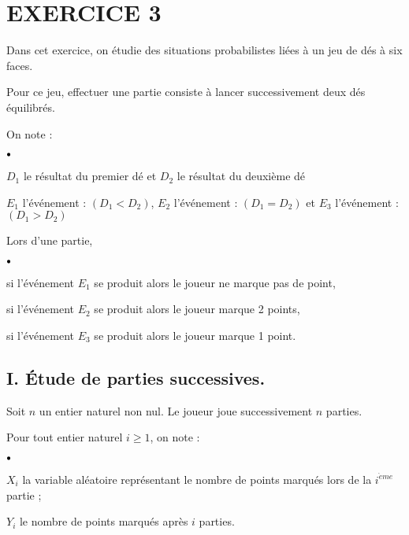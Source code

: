 \documentclass[11pt]{article}%
\begin{document}
\section*{EXERCICE 3}

Dans cet exercice, on étudie des situations probabilistes liées à
un jeu de dés à six faces.

Pour ce jeu, effectuer une partie consiste à lancer successivement deux
dés équilibrés.

On note :

\begin{noliste}{$\scriptstyle \bullet$}
\item $D_{1}$ le résultat du premier dé et $D_{2}$ le résultat
du deuxième dé

\item $E_{1}$ l'événement : $\left( D_{1}<D_{2}\right) $, $E_{2}$
l'événement : $\left( D_{1} = D_{2}\right) $ et $E_{3}$ l'événement :
$\left( D_{1}>D_{2}\right) $
\end{noliste}

Lors d'une partie,

\begin{noliste}{$\scriptstyle \bullet$}
\item si l'événement $E_{1}$ se produit alors le joueur ne marque
pas de point,

\item si l'événement $E_{2}$ se produit alors le joueur marque 2
points,

\item si l'événement $E_{3}$ se produit alors le joueur marque 1
point.
\end{noliste}

\subsection*{I. Étude de parties successives.}

Soit $n$ un entier naturel non nul. Le joueur joue successivement $n$
parties.

Pour tout entier naturel $i\geq 1$, on note :

\begin{noliste}{$\scriptstyle \bullet$}
\item $X_{i}$ la variable aléatoire représentant le nombre de points
marqués lors de la $i^{\grave{e}me}$ partie ;

\item $Y_{i}$ le nombre de points marqués après $i$ parties.
\end{noliste}
\end{document}
